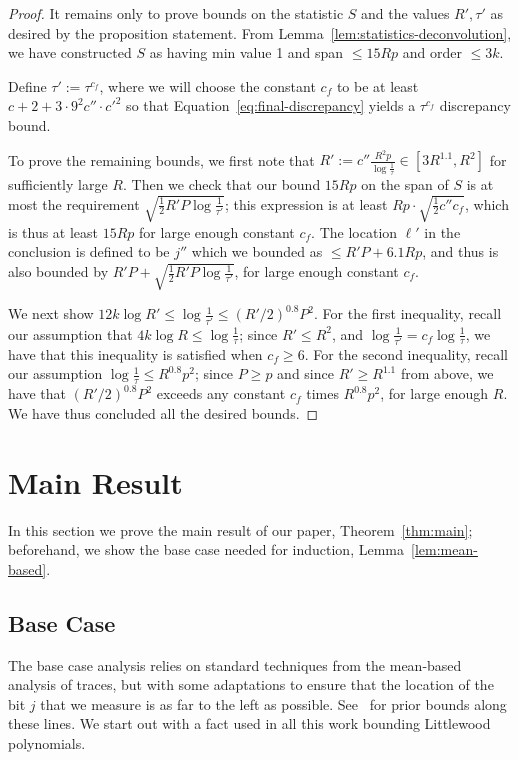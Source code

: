 \documentclass[11pt]{article}
\theoremstyle{plain}
\begin{document}
\begin{proof}
It remains only to prove bounds on the statistic $S$ and the values $R',\tau'$ as desired by the proposition statement. From Lemma~\ref{lem:statistics-deconvolution}, we have constructed $S$ as having min value 1 and span $\leq 15Rp$ and order $\leq 3k$.



Define $\tau':=\tau^{c_f}$, where we will choose the constant $c_f$ to be at least $c+2+3\cdot 9^2c''\cdot {c'}^2$ so that Equation~\ref{eq:final-discrepancy} yields a $\tau^{c_f}$ discrepancy bound.

To prove the remaining bounds, we first note that $R':=c''\frac{R^2 p}{\log\frac{1}{\tau}}\in [3R^{1.1},R^2]$ for sufficiently large $R$. Then we check that our bound $15Rp$ on the span of $S$ is at most the requirement $ \sqrt{\frac{1}{2}R'P\log\frac{1}{\tau'}}$; this expression is at least $Rp \cdot  \sqrt{\frac{1}{2}c'' c_f}$, which is thus at least $15Rp$ for large enough constant $c_f$. The location $\ell'$ in the conclusion is defined to be $j''$ which we bounded as $\leq R'P+6.1Rp$, and thus is also bounded by $R'P+ \sqrt{\frac{1}{2}R'P\log\frac{1}{\tau'}}$, for large enough constant $c_f$.

We next show $12k\log R'\leq \log\frac{1}{\tau'}\leq ({R'}/2)^{0.8}P^2$. For the first inequality, recall our assumption that $4k\log R\leq \log\frac{1}{\tau}$; since $R'\leq R^2$, and $\log\frac{1}{\tau'}=c_f\log\frac{1}{\tau}$, we have that this inequality is satisfied when $c_f\geq 6$. For the second inequality, recall our assumption $\log\frac{1}{\tau}\leq {R}^{0.8}p^2$; since $P\geq p$ and since $R'\geq R^{1.1}$ from above, we have that $({R'}/2)^{0.8}P^2$ exceeds any constant $c_f$ times ${R}^{0.8}p^2$, for large enough $R$. We have thus concluded all the desired bounds.
\end{proof}

\section{Main Result}\label{sec:main}
In this section we prove the main result of our paper, Theorem~\ref{thm:main}; beforehand, we show the base case needed for induction, Lemma~\ref{lem:mean-based}.

\subsection{Base Case}
The base case analysis relies on standard techniques from the mean-based analysis of traces, but with some adaptations to ensure that the location of the bit $j$ that we measure is as far to the left as possible. See~\cite{de2019optimal,peres17Average} for prior bounds along these lines. We start out with a fact used in all this work bounding Littlewood polynomials.
\end{document}
